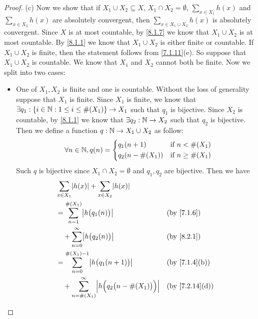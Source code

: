 \begin{proof}{(c)}
	Now we show that if \(X_1 \cup X_2 \subseteq X\), \(X_1 \cap X_2 = \emptyset\), \(\sum_{x \in X_1} h(x)\) and \(\sum_{x \in X_2} h(x)\) are absolutely convergent, then \(\sum_{x \in X_1 \cup X_2} h(x)\) is absolutely convergent.
	Since \(X\) is at most countable, by \cref{8.1.7} we know that \(X_1 \cup X_2\) is at most countable.
	By \cref{8.1.1} we know that \(X_1 \cup X_2\) is either finite or countable.
	If \(X_1 \cup X_2\) is finite, then the statement follows from \cref{7.1.11}(e).
	So suppose that \(X_1 \cup X_2\) is countable.
	We know that \(X_1\) and \(X_2\) cannot both be finite.
	Now we split into two cases:
	\begin{itemize}
		\item One of \(X_1, X_2\) is finite and one is countable.
		      Without the loss of generality suppose that \(X_1\) is finite.
		      Since \(X_1\) is finite, we know that \(\exists q_1 : \left\lbrace i \in \mathbb{N} : 1 \leq i \leq \#(X_1)\right\rbrace \to X_1\) such that \(q_1\) is bijective.
		      Since \(X_2\) is countable, by \cref{8.1.1} we know that \(\exists q_2 : \mathbb{N} \to X_2\) such that \(q_2\) is bijective.
		      Then we define a function \(q : \mathbb{N} \to X_1 \cup X_2\) as follow:
		      \[
			      \forall n \in \mathbb{N}, q(n) = \begin{dcases}
				      q_1(n + 1)       & \text{if } n < \#(X_1)    \\
				      q_2(n - \#(X_1)) & \text{if } n \geq \#(X_1)
			      \end{dcases}
		      \]
		      Such \(q\) is bijective since \(X_1 \cap X_2 = \emptyset\) and \(q_1, q_2\) are bijective.
		      Then we have
		      \begin{align*}
			       & \sum_{x \in X_1} \abs{h(x)} + \sum_{x \in X_2} \abs{h(x)}                                                                              \\
			       & = \sum_{n = 1}^{\#(X_1)} \abs{h\big(q_1(n)\big)}                                                     &  & \by{7.1.6}                   \\
			       & \quad + \sum_{n = 0}^\infty \abs{h\big(q_2(n)\big)}                                                  &  & \by{8.2.1}                   \\
			       & = \sum_{n = 0}^{\#(X_1) - 1} \abs{h\big(q_1(n + 1)\big)}                                             &  & \text{(by \cref{7.1.4}(b))}  \\
			       & \quad + \sum_{n = \#(X_1)}^\infty \abs{h\Big(q_2\big(n - \#(X_1)\big)\Big)}                          &  & \text{(by \cref{7.2.14}(d))} \\

\end{align*}
\end{itemize}
\end{proof}
